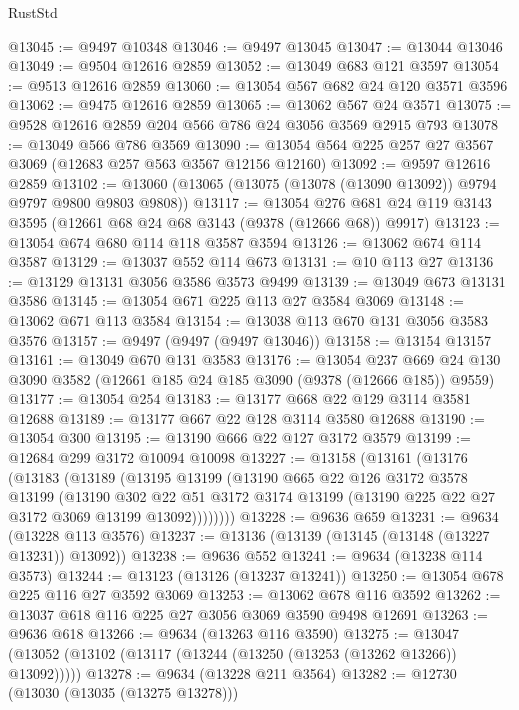\begin{lexlean}{RustStd}
\begin{coremodule}
@13045 := @9497 @10348
@13046 := @9497 @13045
@13047 := @13044 @13046
@13049 := @9504 @12616 @2859
@13052 := @13049 @683 @121 @3597
@13054 := @9513 @12616 @2859
@13060 := @13054 @567 @682 @24 @120 @3571 @3596
@13062 := @9475 @12616 @2859
@13065 := @13062 @567 @24 @3571
@13075 := @9528 @12616 @2859 @204 @566 @786 @24 @3056 @3569 @2915 @793
@13078 := @13049 @566 @786 @3569
@13090 := @13054 @564 @225 @257 @27 @3567 @3069 (@12683 @257 @563 @3567 @12156 @12160)
@13092 := @9597 @12616 @2859
@13102 := @13060 (@13065 (@13075 (@13078 (@13090 @13092)) @9794 @9797 @9800 @9803 @9808))
@13117 := @13054
    @276
    @681
    @24
    @119
    @3143
    @3595
    (@12661 @68 @24 @68 @3143 (@9378 (@12666 @68)) @9917)
@13123 := @13054 @674 @680 @114 @118 @3587 @3594
@13126 := @13062 @674 @114 @3587
@13129 := @13037 @552 @114 @673
@13131 := @10 @113 @27
@13136 := @13129 @13131 @3056 @3586 @3573 @9499
@13139 := @13049 @673 @13131 @3586
@13145 := @13054 @671 @225 @113 @27 @3584 @3069
@13148 := @13062 @671 @113 @3584
@13154 := @13038 @113 @670 @131 @3056 @3583 @3576
@13157 := @9497 (@9497 (@9497 @13046))
@13158 := @13154 @13157
@13161 := @13049 @670 @131 @3583
@13176 := @13054
    @237
    @669
    @24
    @130
    @3090
    @3582
    (@12661 @185 @24 @185 @3090 (@9378 (@12666 @185)) @9559)
@13177 := @13054 @254
@13183 := @13177 @668 @22 @129 @3114 @3581 @12688
@13189 := @13177 @667 @22 @128 @3114 @3580 @12688
@13190 := @13054 @300
@13195 := @13190 @666 @22 @127 @3172 @3579
@13199 := @12684 @299 @3172 @10094 @10098
@13227 := @13158
    (@13161
      (@13176
        (@13183
          (@13189
            (@13195
              @13199
              (@13190
                @665
                @22
                @126
                @3172
                @3578
                @13199
                (@13190
                  @302
                  @22
                  @51
                  @3172
                  @3174
                  @13199
                  (@13190 @225 @22 @27 @3172 @3069 @13199 @13092))))))))
@13228 := @9636 @659
@13231 := @9634 (@13228 @113 @3576)
@13237 := @13136 (@13139 (@13145 (@13148 (@13227 @13231)) @13092))
@13238 := @9636 @552
@13241 := @9634 (@13238 @114 @3573)
@13244 := @13123 (@13126 (@13237 @13241))
@13250 := @13054 @678 @225 @116 @27 @3592 @3069
@13253 := @13062 @678 @116 @3592
@13262 := @13037 @618 @116 @225 @27 @3056 @3069 @3590 @9498 @12691
@13263 := @9636 @618
@13266 := @9634 (@13263 @116 @3590)
@13275 := @13047 (@13052 (@13102 (@13117 (@13244 (@13250 (@13253 (@13262 @13266)) @13092)))))
@13278 := @9634 (@13228 @211 @3564)
@13282 := @12730 (@13030 (@13035 (@13275 @13278)))

\end{coremodule}
\end{lexlean}
